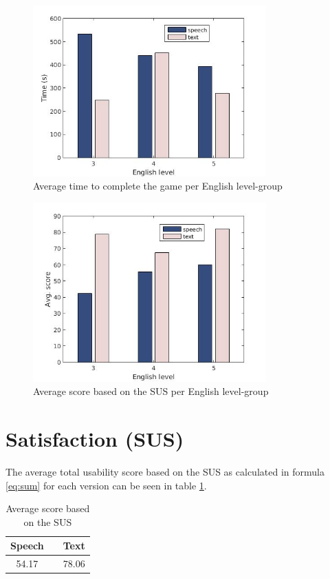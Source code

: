 \begin{figure}[H]
  \centering
  \includegraphics[width=0.8\textwidth]{images/english_time.jpg}
  \caption{Average time to complete the game per English level-group}\label{eng_time}
\end{figure}

\begin{figure}[H]
  \centering
  \includegraphics[width=0.8\textwidth]{images/english_score.jpg}
  \caption{Average score based on the SUS per English level-group}\label{eng_score}
\end{figure}

\section{Satisfaction (SUS)} 
The average total usability score based on the SUS as calculated in formula \ref{eq:sum} for each version can be seen in table \ref{tot_score}.

\begin{table}[ht]
  \centering
  \begin{tabular}{ccc}
    \toprule
    Speech &   & Text\\
    \midrule
    54.17 &   & 78.06\\
    \bottomrule
  \end{tabular}
  \caption{Average score based on the SUS}\label{tot_score}
\end{table}
